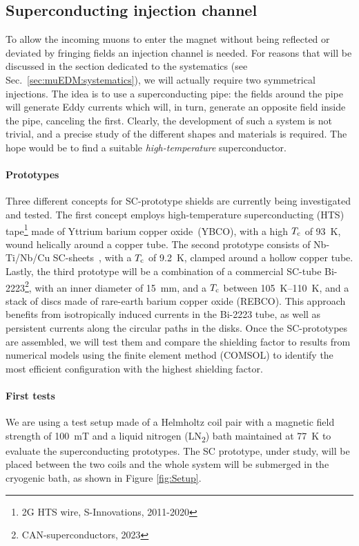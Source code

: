 \begin{refsection}
    \subsection{Superconducting injection channel}
        To allow the incoming muons to enter the magnet without being reflected or deviated by fringing fields an injection channel is needed.
        For reasons that will be discussed in the section dedicated to the systematics (see Sec.~\ref{sec:muEDM:systematics}), we will actually require two symmetrical injections.
        The idea is to use a superconducting pipe: the fields around the pipe will generate Eddy currents which will, in turn, generate an opposite field inside the pipe, canceling the first.
        Clearly, the development of such a system is not trivial, and a precise study of the different shapes and materials is required. 
        The hope would be to find a suitable \textit{high-temperature} superconductor.

        \paragraph{Prototypes}
        Three different concepts for SC-prototype shields are currently being investigated and tested. 
        The first concept employs high-temperature superconducting (HTS) tape\footnote{2G HTS wire, S-Innovations, 2011-2020} made of Yttrium barium copper oxide~(YBCO), with a high $T_{\rm c}$ of \SI{93}{K}, wound helically around a copper tube. The second prototype consists of Nb-Ti/Nb/Cu SC-sheets~\cite{Barna2018}, with a $T_{\rm c}$ of \SI{9.2}{K}, clamped around a hollow copper tube. 
        Lastly, the third prototype will be a combination of a commercial SC-tube Bi-2223\footnote{CAN-superconductors, 2023}, with an inner diameter of \SI{15}{mm}, and a $T_{\rm c}$ between \SIrange{105}{110}{K}, and a stack of discs made of rare-earth barium copper oxide (REBCO)\@. 
        This approach benefits from isotropically induced currents in the Bi-2223 tube, as well as persistent currents along the circular paths in the disks.
        Once the SC-prototypes are assembled, we will test them and compare the shielding factor to results from numerical models using the finite element method (COMSOL) to identify the most efficient configuration with the highest shielding factor. 

        \paragraph{First tests}
        We are using a test setup made of a Helmholtz coil pair with a magnetic field strength of \SI{100}{mT} and a liquid nitrogen (LN\textsubscript{2}) bath maintained at \SI{77}{K} to evaluate the superconducting prototypes. 
        The SC prototype, under study, will be placed between the two coils and the whole system will be submerged in the cryogenic bath, as shown in Figure \ref{fig:Setup}.


\end{refsection}
